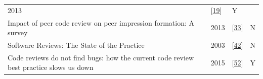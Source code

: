 \documentclass[]{book}
\begin{document}
\begin{longtable}[]{@{}llll@{}}
\begin{minipage}[t]{0.04\columnwidth}
2013\strut
\end{minipage} & \begin{minipage}[t]{0.16\columnwidth}\raggedright\strut
{[}\protect\hyperlink{ref-baysal2013influence}{19}{]}\strut
\end{minipage} & \begin{minipage}[t]{0.12\columnwidth}\raggedright\strut
Y\strut
\end{minipage}\tabularnewline
\begin{minipage}[t]{0.56\columnwidth}\raggedright\strut
Impact of peer code review on peer impression formation: A survey\strut
\end{minipage} & \begin{minipage}[t]{0.04\columnwidth}\raggedright\strut
2013\strut
\end{minipage} & \begin{minipage}[t]{0.16\columnwidth}\raggedright\strut
{[}\protect\hyperlink{ref-bosu2013impact}{33}{]}\strut
\end{minipage} & \begin{minipage}[t]{0.12\columnwidth}\raggedright\strut
N\strut
\end{minipage}\tabularnewline
\begin{minipage}[t]{0.56\columnwidth}\raggedright\strut
Software Reviews: The State of the Practice\strut
\end{minipage} & \begin{minipage}[t]{0.04\columnwidth}\raggedright\strut
2003\strut
\end{minipage} & \begin{minipage}[t]{0.16\columnwidth}\raggedright\strut
{[}\protect\hyperlink{ref-ciolkowski2003software}{42}{]}\strut
\end{minipage} & \begin{minipage}[t]{0.12\columnwidth}\raggedright\strut
N\strut
\end{minipage}\tabularnewline
\begin{minipage}[t]{0.56\columnwidth}\raggedright\strut
Code reviews do not find bugs: how the current code review best practice
slows us down\strut
\end{minipage} & \begin{minipage}[t]{0.04\columnwidth}\raggedright\strut
2015\strut
\end{minipage} & \begin{minipage}[t]{0.16\columnwidth}\raggedright\strut
{[}\protect\hyperlink{ref-czerwonka2015code}{52}{]}\strut
\end{minipage} & \begin{minipage}[t]{0.12\columnwidth}\raggedright\strut
Y\strut
\end{minipage}\tabularnewline
\bottomrule
\end{longtable}
\end{document}
